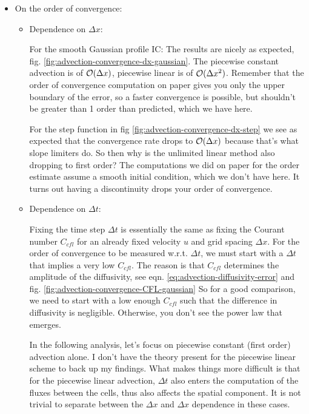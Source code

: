 \begin{itemize}
            
            
    \item On the order of convergence:
     
     	
		\begin{itemize}
  			\item Dependence on $\Delta x$:
				
				For the smooth Gaussian profile IC: The results are nicely as expected, fig. \ref{fig:advection-convergence-dx-gaussian}.
				The piecewise constant advection is of $\mathcal{O}(\Delta x)$, piecewise linear is of $\mathcal{O}(\Delta x^2)$.
				Remember that the order of convergence computation on paper gives you only the upper boundary of the error, so a faster convergence is possible, but shouldn't be greater than 1 order than predicted, which we have here.
				
				
				For the step function in fig \ref{fig:advection-convergence-dx-step} we see as expected that the convergence rate drops to $\mathcal{O}(\Delta x)$ because that's what slope limiters do.
				So then why is the unlimited linear method also dropping to first order?
				The computations we did on paper for the order estimate assume a smooth initial condition, which we don't have here. 
				It turns out having a discontinuity drops your order of convergence.
				
			
			
			\item Dependence on $\Delta t$:
			
				Fixing the time step $\Delta t$ is essentially the same as fixing the Courant number $C_{cfl}$ for an already fixed velocity $u$ and grid spacing $\Delta x$.
				For the order of convergence to be measured w.r.t. $\Delta t$, we must start with a $\Delta t$ that implies a very low $C_{cfl}$.
				The reason is that $C_{cfl}$ determines the amplitude of the diffusivity, see eqn. \ref{eq:advection-diffusivity-error} and fig. \ref{fig:advection-convergence-CFL-gaussian}
				So for a good comparison, we need to start with a low enough $C_{cfl}$ such that the difference in diffusivity is negligible.
				Otherwise, you don't see the power law that emerges.
				
				In the following analysis, let's focus on piecewise constant (first order) advection alone.
				I don't have the theory present for the piecewise linear scheme to back up my findings. 
				What makes things more difficult is that for the piecewise linear advection, $\Delta t$ also enters the computation of the fluxes between the cells, thus also affects the spatial component. 
				It is not trivial to separate between the $\Delta x$ and $\Delta x$ dependence in these cases.
				

\end{itemize}
\end{itemize}
